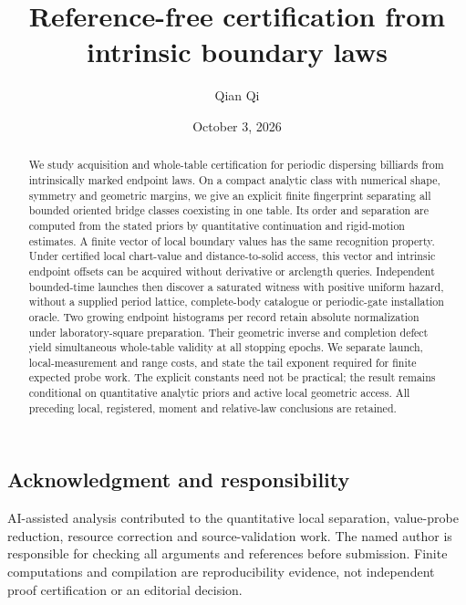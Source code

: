 \documentclass[11pt]{amsart}
\title[Reference-free certification]{Reference-free certification from intrinsic boundary laws}
\author{Qian Qi}\date{October 3, 2026}
\theoremstyle{definition}\newtheorem{definition}[theorem]{Definition}
\theoremstyle{remark}\newtheorem{remark}[theorem]{Remark}
\numberwithin{equation}{section}
\begin{document}
\begin{abstract}
We study acquisition and whole-table certification for periodic dispersing
billiards from intrinsically marked endpoint laws. On a compact analytic
class with numerical shape, symmetry and geometric margins, we give an
explicit finite fingerprint separating all bounded oriented bridge classes
coexisting in one table. Its order and separation are computed from the
stated priors by quantitative continuation and rigid-motion estimates.
A finite vector of local boundary values has the same recognition property.
Under certified local chart-value and distance-to-solid access, this vector
and intrinsic endpoint offsets can be acquired without derivative or
arclength queries. Independent bounded-time launches then discover a
saturated witness with positive uniform hazard, without a supplied period
lattice, complete-body catalogue or periodic-gate installation oracle.
Two growing endpoint histograms per record retain absolute normalization
under laboratory-square preparation. Their geometric inverse and completion
defect yield simultaneous whole-table validity at all stopping epochs.
We separate launch, local-measurement and range costs, and state the tail
exponent required for finite expected probe work. The explicit constants
need not be practical; the result remains conditional on quantitative
analytic priors and active local geometric access. All preceding local,
registered, moment and relative-law conclusions are retained.
\end{abstract}
\maketitle








\subsection*{Acknowledgment and responsibility}
AI-assisted analysis contributed to the quantitative local separation,
value-probe reduction, resource correction and source-validation work.
The named author is responsible for checking all arguments and references
before submission. Finite computations and compilation are reproducibility
evidence, not independent proof certification or an editorial decision.
\clearpage

\end{document}

